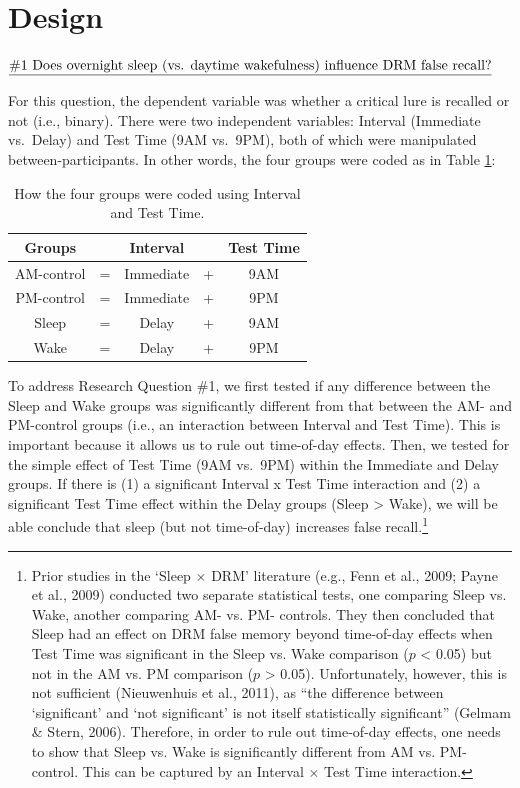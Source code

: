 \documentclass[
]{article}
\begin{document}
\hypertarget{design}{%
\section{Design}\label{design}}

\(\text{\underline{\#1 Does overnight sleep (vs. daytime wakefulness) influence DRM false recall?}}\)

For this question, the dependent variable was whether a critical lure is recalled or not (i.e., binary). There were two independent variables: Interval (Immediate vs.~Delay) and Test Time (9AM vs.~9PM), both of which were manipulated between-participants. In other words, the four groups were coded as in Table \ref{tab:table1}:

\begin{table}[H]

\caption{\label{tab:table1}How the four groups were coded using Interval and Test Time.}
\centering
\begin{tabular}[t]{ccccc}
\toprule
\textbf{Groups} & \textbf{ } & \textbf{Interval} & \textbf{ } & \textbf{Test Time}\\
\midrule
AM-control & = & Immediate & + & 9AM\\
PM-control & = & Immediate & + & 9PM\\
Sleep & = & Delay & + & 9AM\\
Wake & = & Delay & + & 9PM\\
\bottomrule
\end{tabular}
\end{table}

To address Research Question \#1, we first tested if any difference between the Sleep and Wake groups was significantly different from that between the AM- and PM-control groups (i.e., an interaction between Interval and Test Time). This is important because it allows us to rule out time-of-day effects. Then, we tested for the simple effect of Test Time (9AM vs.~9PM) within the Immediate and Delay groups. If there is (1) a significant Interval x Test Time interaction and (2) a significant Test Time effect within the Delay groups (Sleep \textgreater{} Wake), we will be able conclude that sleep (but not time-of-day) increases false recall.\footnote{Prior studies in the ‘Sleep $\times$ DRM’ literature (e.g., Fenn et al., 2009; Payne et al., 2009) conducted two separate statistical tests, one comparing Sleep vs. Wake, another comparing AM- vs. PM- controls. They then concluded that Sleep had an effect on DRM false memory beyond time-of-day effects when Test Time was significant in the Sleep vs. Wake comparison ($p$ < 0.05) but not in the AM vs. PM comparison ($p$ > 0.05). Unfortunately, however, this is not sufficient (Nieuwenhuis et al., 2011), as “the difference between ‘significant’ and ‘not significant’ is not itself statistically significant” (Gelmam \& Stern, 2006). Therefore, in order to rule out time-of-day effects, one needs to show that Sleep vs. Wake is significantly different from AM vs. PM-control. This can be captured by an Interval $\times$ Test Time interaction.}
\end{document}
